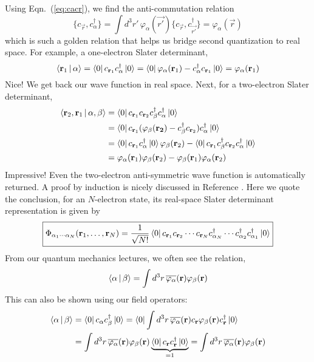 %
Using Eqn.~(\ref{eq:cacr}), we find the anti-commutation relation
\begin{equation}
\{c_\vec{r}, c_\alpha^\dagger \} =
\int d^3r'\,\varphi_\alpha(\vec{r'}) \{c_\vec{r}, c_\vec{r'}^\dagger \} = \varphi_\alpha(\vec{r})
\end{equation}
which is such a golden relation that helps us bridge
second quantization to real space. For example,
a one-electron Slater determinant,
\begin{equation}
\Braket{\vec{r}_1|\alpha} = \Bra{0} c_{\vec{r}_1} c_{\alpha}^\dagger \Ket{0}
= \Bra{0} \varphi_{\alpha}(\vec{r}_1) - c_{\alpha}^\dagger c_{\vec{r}_1} \Ket{0}
= \varphi_{\alpha}(\vec{r}_1)
\end{equation}
Nice! We get back our wave function in real space. Next,
for a two-electron Slater determinant,
\begin{align}
\Braket{\vec{r}_2,\vec{r}_1|\alpha,\beta}
& = \Bra{0} c_{\vec{r}_1} c_{\vec{r}_2} c_{\beta}^\dagger c_{\alpha}^\dagger \Ket{0} \nonumber \\
& = \Bra{0} c_{\vec{r}_1} (\varphi_\beta(\vec{r_2}) - c_{\beta}^\dagger c_{\vec{r}_2}) c_{\alpha}^\dagger \Ket{0} \nonumber \\
& = \Bra{0} c_{\vec{r}_1} c_\alpha^\dagger \Ket{0} \varphi_\beta(\vec{r}_2) - \Bra{0} c_{\vec{r}_1} c_{\beta}^\dagger c_{\vec{r}_2} c_\alpha^\dagger \Ket{0} \nonumber \\
& = \varphi_\alpha(\vec{r}_1) \varphi_\beta(\vec{r}_2) - \varphi_\beta(\vec{r}_1) \varphi_\alpha(\vec{r}_2)
\end{align}
%
Impressive! Even the two-electron anti-symmetric wave function is automatically returned.
A proof by induction is nicely discussed in Reference \cite{GBK}. Here we quote
the conclusion, for an $N$-electron state, its real-space Slater determinant
representation is given by
\begin{equation} \label{eq:bridge}
\boxed{
\Phi_{\alpha_1\cdots\alpha_N}(\vec{r}_1,\ldots,\vec{r}_N)
= \frac{1}{\sqrt{N!}}
\Bra{0} c_{\vec{r}_1} c_{\vec{r}_2} \cdots c_{\vec{r}_N}
c_{\alpha_N}^\dagger \cdots c_{\alpha_2}^\dagger c_{\alpha_1}^\dagger \Ket{0}
}
\end{equation}
%
From our quantum mechanics lectures, we often see the relation,
\begin{equation}
\Braket{\alpha|\beta} = \int d^3r\, \conj{\varphi_\alpha}(\vec{r}) \varphi_\beta(\vec{r})
\end{equation}
This can also be shown using our field operators:
\begin{align}
\Braket{\alpha|\beta}
& = \Bra{0} c_\alpha c_\beta^\dagger \Ket{0}
 = \Bra{0} \int d^3r\, \conj{\varphi_\alpha}(\vec{r}) c_\vec{r} \varphi_\beta(\vec{r}) c_{\vec{r}}^\dagger \Ket{0} \nonumber \\
& = \int d^3r\, \conj{\varphi_\alpha}(\vec{r}) \varphi_\beta(\vec{r}) \underbrace{\Bra{0} c_\vec{r} c_{\vec{r}}^\dagger \Ket{0}}_{=1}
= \int d^3r\, \conj{\varphi_\alpha}(\vec{r}) \varphi_\beta(\vec{r})
\end{align}
